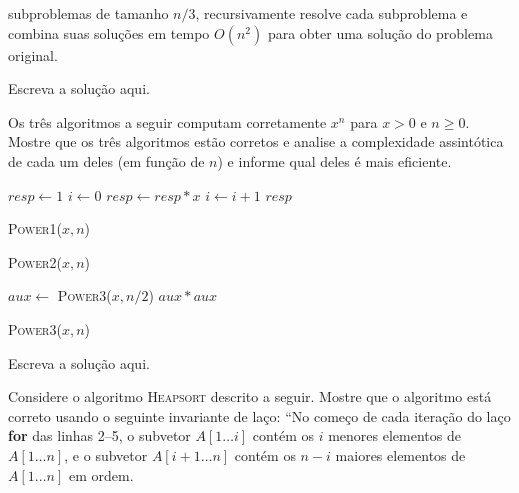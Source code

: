 \documentclass[a4paper]{exam}
\begin{document}
\begin{questions}
\begin{itemize}
      subproblemas de tamanho $n/3$, recursivamente resolve cada
      subproblema e combina suas soluções em tempo $O(n^2)$ para obter
      uma solução do problema original.
  \end{itemize}
  \begin{solution}
    Escreva a solução aqui.
  \end{solution}
  \question Os três algoritmos a seguir computam corretamente
  $x^n$ para $x>0$ e $n \geq 0$. Mostre que os três algoritmos estão
  corretos e analise a complexidade assintótica
  de cada um deles (em função de $n$) e informe qual deles é mais
  eficiente.
  \setlength{\algoheightrule}{0pt}
  \setlength{\algotitleheightrule}{0pt}
  \begin{center}
    \vspace{-1cm}
    \begin{minipage}[t][][c]{.25\textwidth}
      \begin{algorithm}[H]
        \NoCaptionOfAlgo
        \DontPrintSemicolon
        $resp \gets 1$\;
        $i \gets 0$\;
         {
          $resp \gets resp * x$\;
          $i \gets i + 1$\;
        }
        \Return $resp$\;
        \caption{\textsc{Power1}($x, n$)}
      \end{algorithm}
    \end{minipage}%
  \begin{minipage}[t][][c]{.35\textwidth} 
      \begin{algorithm}[H]
        \NoCaptionOfAlgo
        \DontPrintSemicolon
        \caption{\textsc{Power2}($x,n$)}
      \end{algorithm}
    \end{minipage}%
    \begin{minipage}[t][][c]{.38\textwidth} 
      \begin{algorithm}[H]
        \NoCaptionOfAlgo
        \DontPrintSemicolon
         {
          $aux \leftarrow $ \textsc{Power3}($x, n/2$)\;
          \Return $aux*aux$\;
        }
        \caption{\textsc{Power3}($x,n$)}
      \end{algorithm}
    \end{minipage}
  \end{center}
  \begin{solution}
    Escreva a solução aqui.
  \end{solution}
  \question Considere o algoritmo \textsc{Heapsort} descrito a
  seguir. Mostre que o algoritmo está correto usando o seguinte
  invariante de laço: ``No começo de cada iteração do laço
  \textbf{for} das linhas 2--5, o subvetor $A[1 \dots i]$ contém os $i$
  menores elementos de $A[1 \dots n]$, e o subvetor $A[i{+}1 \dots n]$ contém
  os $n-i$ maiores elementos de $A[1 \dots n]$ em ordem.


\end{questions}
\end{document}
